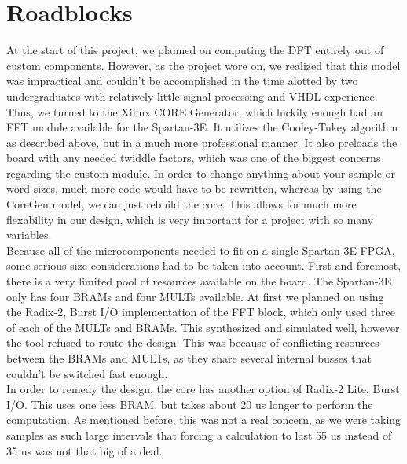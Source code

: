 \documentclass[12pt]{article}
\begin{document}
  \section*{Roadblocks}
    At the start of this project, we planned on computing the DFT entirely out of custom components.
    However, as the project wore on, we realized that this model was impractical and couldn't be accomplished in the time alotted by two undergraduates with relatively little signal processing and VHDL experience.
    Thus, we turned to the Xilinx CORE Generator, which luckily enough had an FFT module available for the Spartan-3E.
    It utilizes the Cooley-Tukey algorithm as described above, but in a much more professional manner.
    It also preloads the board with any needed twiddle factors, which was one of the biggest concerns regarding the custom module.
    In order to change anything about your sample or word sizes, much more code would have to be rewritten, whereas by using the CoreGen model, we can just rebuild the core.
    This allows for much more flexability in our design, which is very important for a project with so many variables.\\

    Because all of the microcomponents needed to fit on a single Spartan-3E FPGA, some serious size considerations had to be taken into account.
    First and foremost, there is a very limited pool of resources available on the board.
    The Spartan-3E only has four BRAMs and four MULTs available.
    At first we planned on using the Radix-2, Burst I/O implementation of the FFT block, which only used three of each of the MULTs and BRAMs.
    This synthesized and simulated well, however the tool refused to route the design.
    This was because of conflicting resources between the BRAMs and MULTs, as they share several internal busses that couldn't be switched fast enough.\\
    
    In order to remedy the design, the core has another option of Radix-2 Lite, Burst I/O.
    This uses one less BRAM, but takes about 20 us longer to perform the computation.
    As mentioned before, this was not a real concern, as we were taking samples as such large intervals that forcing a calculation to last 55 us instead of 35 us was not that big of a deal.\\
\end{document}
